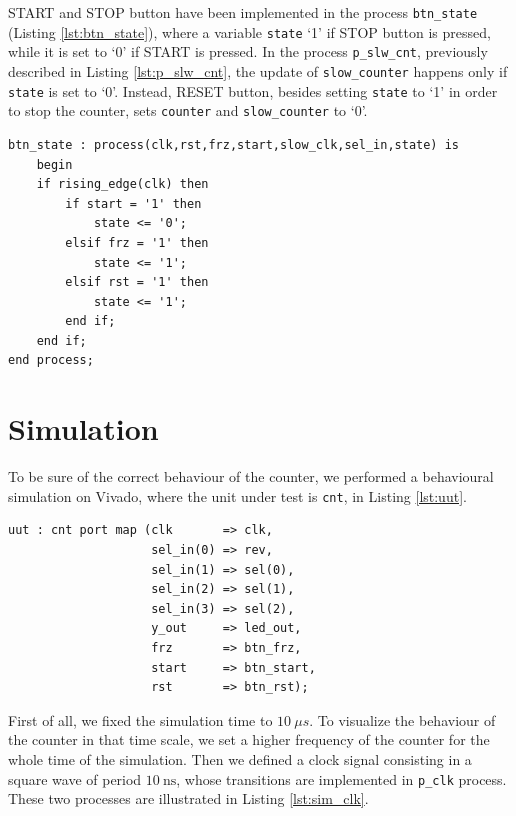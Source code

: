 \documentclass[11pt, a4paper]{article}
\begin{document}
START and STOP button have been implemented in the process {\footnotesize\texttt{btn\_state}} (Listing \ref{lst:btn_state}), where a variable {\footnotesize\texttt{state}} ‘1’ if STOP button is pressed, while it is set to ‘0’ if START is pressed.
In the process {\footnotesize\texttt{p\_slw\_cnt}}, previously described in Listing \ref{lst:p_slw_cnt}, the update of {\footnotesize\texttt{slow\_counter}} happens only if {\footnotesize\texttt{state}} is set to ‘0’. Instead, RESET button, besides setting {\footnotesize\texttt{state}} to ‘1’ in order to stop the counter, sets {\footnotesize\texttt{counter}} and {\footnotesize\texttt{slow\_counter}} to ‘0’.

\begin{lstlisting}[style=vhdl,label={lst:btn_state},caption={{\footnotesize\texttt{btn\_state}} process.}]
btn_state : process(clk,rst,frz,start,slow_clk,sel_in,state) is
    begin
    if rising_edge(clk) then
        if start = '1' then
            state <= '0';
        elsif frz = '1' then
            state <= '1';
        elsif rst = '1' then
            state <= '1';
        end if;
    end if;
end process;\end{lstlisting}





\section{Simulation}
To be sure of the correct behaviour of the counter, we performed a behavioural simulation on Vivado, where the unit under test is {\footnotesize\texttt{cnt}}, in Listing \ref{lst:uut}.

\begin{lstlisting}[style=vhdl,label={lst:uut},caption={{\footnotesize\texttt{uut}} process.}]
uut : cnt port map (clk       => clk,
                    sel_in(0) => rev,
                    sel_in(1) => sel(0),
                    sel_in(2) => sel(1),
                    sel_in(3) => sel(2),
                    y_out     => led_out,
                    frz       => btn_frz,
                    start     => btn_start,
                    rst       => btn_rst);
\end{lstlisting}


First of all, we fixed the simulation time to \( \SI{10}{\mu s} \). To visualize the behaviour of the counter in that time scale, we set a higher frequency of the counter for the whole time of the simulation. 
Then we defined a clock signal consisting in a square wave of period $\SI{10}{\ns}$, whose transitions are implemented in {\footnotesize\texttt{p\_clk}} process. These two processes are illustrated in Listing \ref{lst:sim_clk}.
\end{document}
